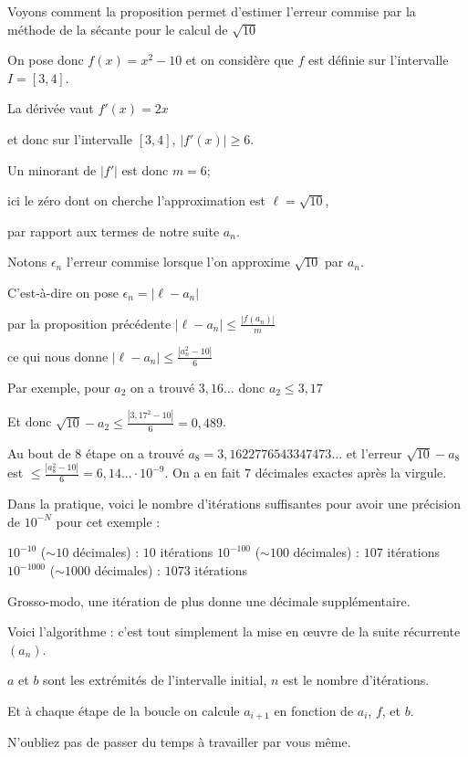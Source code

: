 Voyons comment la proposition permet d'estimer l'erreur commise par la méthode de la sécante
pour le calcul de $\sqrt{10}$

On pose donc  $f(x)=x^2-10$ et on considère que $f$ est définie sur l'intervalle $I=[3,4]$. 

\change


La dérivée vaut $f'(x)=2x$ 

et donc sur l'intervalle $[3,4]$,  $|f'(x)| \ge 6$. 

\change

Un minorant de $|f'|$ est donc $m=6$; 

ici le zéro dont on cherche l'approximation est $\ell=\sqrt{10}$, 

par rapport aux termes de notre suite $a_n$.

\change


Notons $\epsilon_n$ l'erreur commise lorsque l'on approxime $\sqrt {10}$ par $a_n$.

C'est-à-dire on pose $\epsilon_n = |\ell-a_n|$

par la proposition précédente 
$|\ell-a_n| \le \frac{|f(a_n)|}{m}$

ce qui nous donne $|\ell-a_n| \le  \frac{|a_n^2 - 10|}{6}$

\change

Par exemple, pour $a_2$  on a trouvé $3,16...$ donc $a_2 \le 3,17$

Et donc $\sqrt{10}-a_2 \le \frac{|3,17^2-10|}{6} = 0,489$.

\change

Au bout de $8$ étape on a trouvé $a_8=3,1622776543347473\ldots$
et l'erreur  $\sqrt{10}-a_8$ est $ \le \frac{|a_8^2-10|}{6} = 6,14\ldots \cdot 10^{-9}$. 
On a en fait $7$ décimales exactes après la virgule.

\change


Dans la pratique, voici le nombre d'itérations suffisantes pour avoir une 
précision de $10^{-N}$ pour cet exemple :

  $10^{-10}$ ($\sim 10$ décimales) : $10$ itérations 
  $10^{-100}$ ($\sim 100$ décimales) : $107$ itérations 
  $10^{-1000}$ ($\sim 1000$ décimales) : $1073$ itérations 
  
Grosso-modo, une itération 
de plus donne une décimale supplémentaire.



\diapo

Voici l'algorithme : c'est tout simplement 
la mise en \oe uvre de la suite récurrente $(a_n)$.

$a$ et $b$ sont les extrémités de l'intervalle initial, $n$ est le nombre d'itérations.

Et à chaque étape de la boucle on calcule $a_{i+1}$ en fonction de $a_i$, $f$, et $b$.




\diapo

N'oubliez pas de passer du temps à travailler par vous même.




